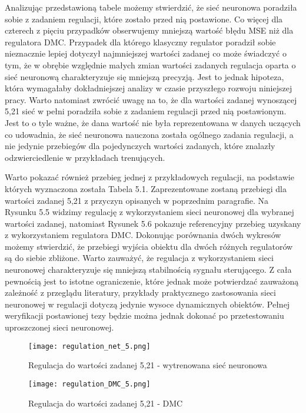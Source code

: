 Analizując przedstawioną tabele możemy stwierdzić, że sieć neuronowa poradziła sobie z zadaniem regulacji, które zostało przed nią postawione. Co więcej dla czterech z pięciu przypadków obserwujemy mniejszą wartość błędu MSE niż dla regulatora DMC. Przypadek dla którego klasyczny regulator poradził sobie nieznacznie lepiej dotyczył najmniejszej wartości zadanej co może świadczyć o tym, że w obrębie względnie małych zmian wartości zadanych regulacja oparta o sieć neuronową charakteryzuje się mniejszą precyzją. Jest to jednak hipoteza, która wymagałaby dokładniejszej analizy w czasie przyszłego rozwoju niniejszej pracy. Warto natomiast zwrócić uwagę na to, że dla wartości zadanej wynoszącej 5,21 sieć w pełni poradziła sobie z zadaniem regulacji przed nią postawionym. Jest to o tyle ważne, że dana wartość nie była reprezentowana w danych uczących co udowadnia, że sieć neuronowa nauczona została ogólnego zadania regulacji, a nie jedynie przebiegów dla pojedynczych wartości zadanych, które znalazły odzwierciedlenie w przykładach trenujących. 

\par Warto pokazać również przebieg jednej z przykładowych regulacji, na podstawie których wyznaczona została Tabela 5.1. Zaprezentowane zostaną przebiegi dla wartości zadanej 5,21 z przyczyn opisanych w poprzednim paragrafie. Na Rysunku 5.5 widzimy regulację z wykorzystaniem sieci neuronowej dla wybranej wartości zadanej, natomiast Rysunek 5.6 pokazuje referencyjny przebieg uzyskany z wykorzystaniem regulatora DMC. Dokonując porównania dwóch wykresów możemy stwierdzić, że przebiegi wyjścia obiektu dla dwóch różnych regulatorów są do siebie zbliżone. Warto zauważyć, że regulacja z wykorzystaniem sieci neuronowej charakteryzuje się mniejszą stabilnością sygnału sterującego. Z cała pewnością jest to istotne ograniczenie, które jednak może potwierdzać zauważoną zależność z przeglądu literatury, przykłady praktycznego zastosowania sieci neuronowej w regulacji dotyczą jedynie wysoce dynamicznych obiektów. Pełnej weryfikacji postawionej tezy będzie można jednak dokonać po przetestowaniu uproszczonej sieci neuronowej.

\begin{figure}[!h]
  \label{fig:sim-net-5}
  \centering \texttt{[image: regulation\_net\_5.png]}
  \caption{Regulacja do wartości zadanej 5,21 - wytrenowana sieć neuronowa}

  \vspace*{\floatsep}%

  \label{fig:sim-dmc-5}
  \centering \texttt{[image: regulation\_DMC\_5.png]}
  \caption{Regulacja do wartości zadanej 5,21 - DMC}
\end{figure}

